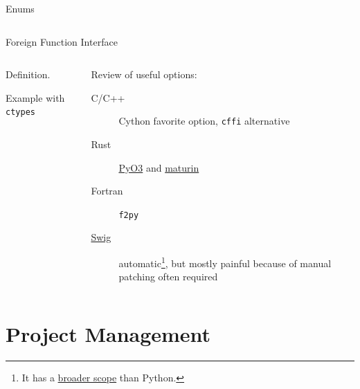 \documentclass[9pt]{beamer}
\begin{document}
\begin{frame}{Enums}
    \begin{columns}
        \begin{column}{0.5\textwidth}
        \end{column}
        \begin{column}{0.5\textwidth}
        \end{column}
    \end{columns}
\end{frame}

\begin{frame}{Foreign Function Interface}
    \begin{columns}
        \begin{column}{0.5\textwidth}
            Definition.

            Example with \texttt{ctypes}
        \end{column}
        \begin{column}{0.5\textwidth}
            Review of useful options:

            \begin{description}
                \item[C/C++] Cython favorite option, \texttt{cffi} alternative
                \item[Rust] \href{https://pyo3.rs/}{PyO3} and
                  \href{https://maturin.rs}{maturin}
                \item[Fortran] \texttt{f2py}
                \item[\href{https://www.swig.org/}{Swig}] automatic\footnote{
                    It has a
                    \href{https://www.swig.org/compat.html\#SupportedLanguages}{broader
                    scope} than Python.
                  }, but mostly
                  painful because of manual patching often required
            \end{description}
        \end{column}
    \end{columns}
\end{frame}

\section{Project Management}
\end{document}

